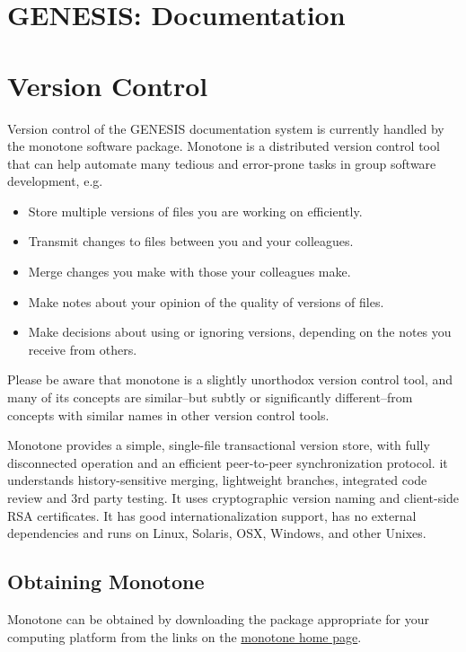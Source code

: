 \documentclass[12pt]{article}
\begin{document}
\section*{GENESIS: Documentation}

\section*{Version Control}

Version control of the GENESIS documentation system is currently handled by the monotone software package. Monotone is a distributed version control tool that can help automate many tedious and error-prone tasks in group software development, e.g.
\begin{itemize}
\item Store multiple versions of files you are working on efficiently.
\item Transmit changes to files between you and your colleagues.
\item Merge changes you make with those your colleagues make.
\item Make notes about your opinion of the quality of versions of files.
\item Make decisions about using or ignoring versions, depending on the notes you receive from others. 
\end{itemize}
Please be aware that monotone is a slightly unorthodox version control tool, and many of its concepts are similar--but subtly or significantly different--from concepts with similar names in other version control tools. 

Monotone provides a simple, single-file transactional version store, with fully disconnected operation and an efficient peer-to-peer synchronization protocol. it understands history-sensitive merging, lightweight branches, integrated code review and 3rd party testing. It uses cryptographic version naming and client-side RSA certificates. It has good internationalization support, has no external dependencies and runs on Linux, Solaris, OSX, Windows, and other Unixes.

\subsection*{Obtaining Monotone}
Monotone can be obtained by downloading the package appropriate for your computing platform from the links on the \href{http://monotone.ca/}{monotone home page}.

\end{document}

